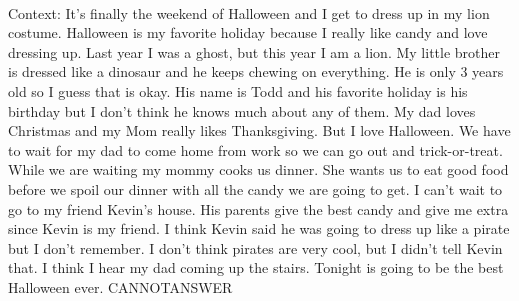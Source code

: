 \documentclass[11pt,a4paper, onecolumn]{article}
\begin{document}
\\ Context: It's finally the weekend of Halloween and I get to dress up in my lion costume. Halloween is my favorite holiday because I really like candy and love dressing up. Last year I was a ghost, but this year I am a lion. My little brother is dressed like a dinosaur and he keeps chewing on everything. He is only 3 years old so I guess that is okay. His name is Todd and his favorite holiday is his birthday but I don't think he knows much about any of them. My dad loves Christmas and my Mom really likes Thanksgiving. But I love Halloween. We have to wait for my dad to come home from work so we can go out and trick-or-treat. While we are waiting my mommy cooks us dinner. She wants us to eat good food before we spoil our dinner with all the candy we are going to get. I can't wait to go to my friend Kevin's house. His parents give the best candy and give me extra since Kevin is my friend. I think Kevin said he was going to dress up like a pirate but I don't remember. I don't think pirates are very cool, but I didn't tell Kevin that. I think I hear my dad coming up the stairs. Tonight is going to be the best Halloween ever. CANNOTANSWER
\end{document}
